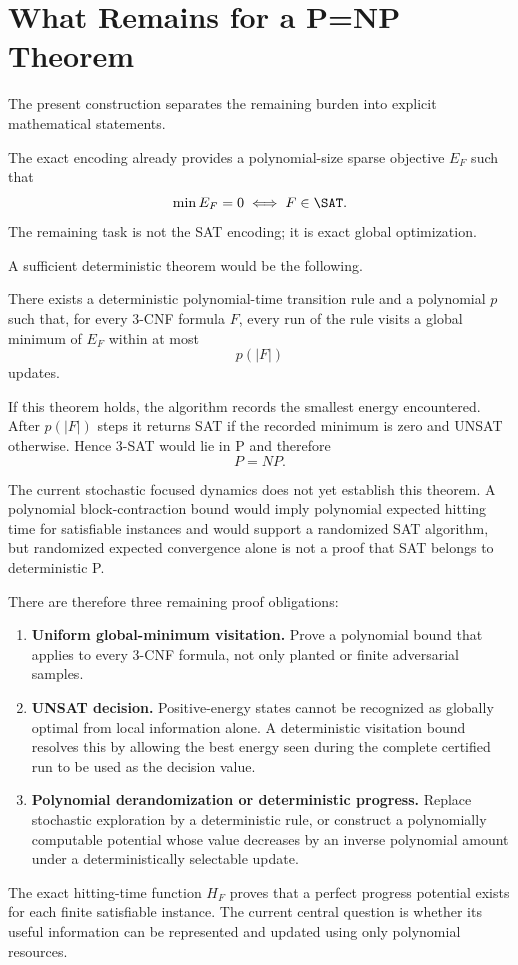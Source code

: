 \section{What Remains for a P=NP Theorem}
\label{sec:pnp-roadmap}

The present construction separates the remaining burden into explicit
mathematical statements.

The exact encoding already provides a polynomial-size sparse objective
$E_F$ such that
\begin{equation}
\min E_F=0
\iff
F\in\SAT.
\end{equation}
The remaining task is not the SAT encoding; it is exact global optimization.

A sufficient deterministic theorem would be the following.

\begin{theorem}
There exists a deterministic polynomial-time transition rule and a polynomial
$p$ such that, for every 3-CNF formula $F$, every run of the rule visits a
global minimum of $E_F$ within at most
\begin{equation}
p(|F|)
\end{equation}
updates.
\end{theorem}

If this theorem holds, the algorithm records the smallest energy encountered.
After $p(|F|)$ steps it returns SAT if the recorded minimum is zero and UNSAT
otherwise.  Hence 3-SAT would lie in P and therefore
\begin{equation}
\boxed{P=NP.}
\end{equation}

The current stochastic focused dynamics does not yet establish this theorem.
A polynomial block-contraction bound would imply polynomial expected hitting
time for satisfiable instances and would support a randomized SAT algorithm,
but randomized expected convergence alone is not a proof that SAT belongs to
deterministic P.

There are therefore three remaining proof obligations:

\begin{enumerate}
\item \textbf{Uniform global-minimum visitation.}
      Prove a polynomial bound that applies to every 3-CNF formula, not only
      planted or finite adversarial samples.

\item \textbf{UNSAT decision.}
      Positive-energy states cannot be recognized as globally optimal from
      local information alone.  A deterministic visitation bound resolves this
      by allowing the best energy seen during the complete certified run to be
      used as the decision value.

\item \textbf{Polynomial derandomization or deterministic progress.}
      Replace stochastic exploration by a deterministic rule, or construct a
      polynomially computable potential whose value decreases by an inverse
      polynomial amount under a deterministically selectable update.
\end{enumerate}

The exact hitting-time function $H_F$ proves that a perfect progress potential
exists for each finite satisfiable instance.  The current central question is
whether its useful information can be represented and updated using only
polynomial resources.
